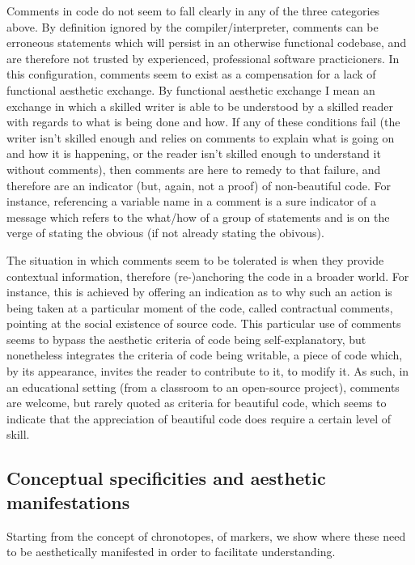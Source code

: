 Comments in code do not seem to fall clearly in any of the three categories above. By definition ignored by the compiler/interpreter, comments can be erroneous statements which will persist in an otherwise functional codebase, and are therefore not trusted by experienced, professional software practicioners. In this configuration, comments seem to exist as a compensation for a lack of functional aesthetic exchange. By functional aesthetic exchange I mean an exchange in which a skilled writer is able to be understood by a skilled reader with regards to what is being done and how. If any of these conditions fail (the writer isn't skilled enough and relies on comments to explain what is going on and how it is happening, or the reader isn't skilled enough to understand it without comments), then comments are here to remedy to that failure, and therefore are an indicator (but, again, not a proof) of non-beautiful code. For instance, referencing a variable name in a comment is a sure indicator of a message which refers to the what/how of a group of statements and is on the verge of stating the obvious (if not already stating the obivous).

The situation in which comments seem to be tolerated is when they provide contextual information, therefore (re-)anchoring the code in a broader world. For instance, this is achieved by offering an indication as to why such an action is being taken at a particular moment of the code, called contractual comments, pointing at the social existence of source code. This particular use of comments seems to bypass the aesthetic criteria of code being self-explanatory, but nonetheless integrates the criteria of code being writable, a piece of code which, by its appearance, invites the reader to contribute to it, to modify it. As such, in an educational setting (from a classroom to an open-source project), comments are welcome, but rarely quoted as criteria for beautiful code, which seems to indicate that the appreciation of beautiful code does require a certain level of skill.

\subsection{Conceptual specificities and aesthetic manifestations}
\label{subsec:conceptual-specificities}

Starting from the concept of chronotopes, of markers, we show where these need to be aesthetically manifested in order to facilitate understanding.

